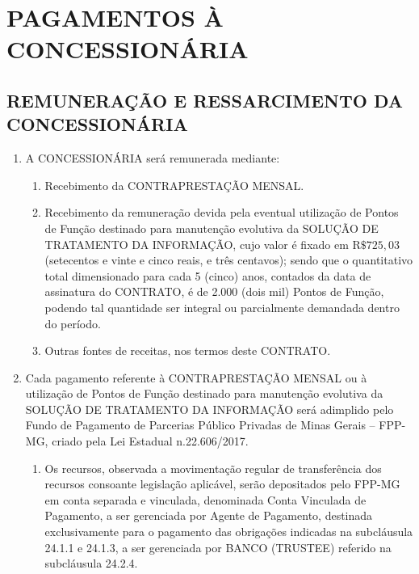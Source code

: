 \documentclass[a4paper,11pt]{report} %
\begin{document}
\chapter{PAGAMENTOS À CONCESSIONÁRIA}
\section{REMUNERAÇÃO E RESSARCIMENTO DA CONCESSIONÁRIA}
\label{sec:UJ97}

\begin{enumerate}
\item \label{itm:UYTP} A CONCESSIONÁRIA será remunerada mediante:

\begin{enumerate}[label*=\arabic*.]
\item \label{itm:KXEU} Recebimento da CONTRAPRESTAÇÃO MENSAL.

\item \label{itm:YJ5E} Recebimento da remuneração devida pela eventual utilização de Pontos de Função destinado para manutenção evolutiva da SOLUÇÃO DE TRATAMENTO DA INFORMAÇÃO, cujo valor é fixado em R$\$ 725,03$ (setecentos e vinte e cinco reais, e três centavos); sendo que o quantitativo total dimensionado para cada 5 (cinco) anos, contados da data de assinatura do CONTRATO, é de 2.000 (dois mil) Pontos de Função, podendo tal quantidade ser integral ou parcialmente demandada dentro do período.

\item \label{itm:F3F8} Outras fontes de receitas, nos termos deste CONTRATO.
\end{enumerate}

\item \label{itm:SUJU} Cada pagamento referente à CONTRAPRESTAÇÃO MENSAL ou à utilização de Pontos de Função destinado para manutenção evolutiva da SOLUÇÃO DE TRATAMENTO DA INFORMAÇÃO será adimplido pelo Fundo de Pagamento de Parcerias Público Privadas de Minas Gerais – FPP-MG, criado pela Lei Estadual n.22.606/2017. 

\begin{enumerate}[label*=\arabic*.]
\item \label{itm:UF2K} Os recursos, observada a movimentação regular de transferência dos recursos consoante legislação aplicável, serão depositados pelo FPP-MG em conta separada e vinculada, denominada Conta Vinculada de Pagamento, a ser gerenciada por Agente de Pagamento, destinada exclusivamente para o pagamento das obrigações indicadas na subcláusula 24.1.1 e 24.1.3, a ser gerenciada por BANCO (TRUSTEE) referido na subcláusula 24.2.4.


\end{enumerate}
\end{enumerate}
\end{document}
